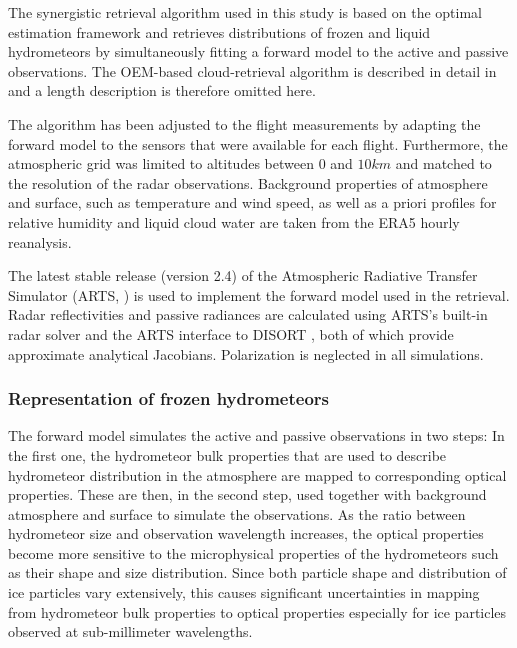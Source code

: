 \documentclass[journal abbreviation, manuscript]{copernicus}
\begin{document}
The synergistic retrieval algorithm used in this study is based on the optimal
estimation framework \citep{rodgers00} and retrieves distributions of frozen and
liquid hydrometeors by simultaneously fitting a forward model to the active and
passive observations. The OEM-based cloud-retrieval algorithm is described in
detail in \citet{pfreundschuh19} and a length description is therefore omitted
here.

The algorithm has been adjusted to the flight measurements by adapting the
forward model to the sensors that were available for each flight. Furthermore,
the atmospheric grid was limited to altitudes between $0$ and $10 \unit{km}$ and
matched to the resolution of the radar observations. Background properties of
atmosphere and surface, such as temperature and wind speed, as well as a priori
profiles for relative humidity and liquid cloud water are taken from the ERA5
hourly reanalysis.

The latest stable release (version 2.4) of the Atmospheric Radiative Transfer
Simulator (ARTS, \citet{arts18}) is used to implement the forward model used in
the retrieval. Radar reflectivities and passive radiances are calculated using
ARTS's built-in radar solver and the ARTS interface to DISORT \citep{disort00},
both of which provide approximate analytical Jacobians. Polarization is
neglected in all simulations.

\subsubsection{Representation of frozen hydrometeors}

The forward model simulates the active and passive observations in two steps: In
the first one, the hydrometeor bulk properties that are used to describe
hydrometeor distribution in the atmosphere are mapped to corresponding optical
properties. These are then, in the second step, used together with background
atmosphere and surface to simulate the observations. As the ratio between
hydrometeor size and observation wavelength increases, the optical properties
become more sensitive to the microphysical properties of the hydrometeors such
as their shape and size distribution. Since both particle shape and distribution
of ice particles vary extensively, this causes significant uncertainties in
mapping from hydrometeor bulk properties to optical properties especially for
ice particles observed at sub-millimeter wavelengths.
\end{document}
